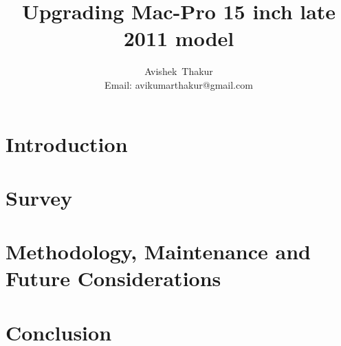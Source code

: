 \documentclass[12pt, journal, a4paper]{IEEEtran}
\begin{document}
\title{Upgrading Mac-Pro 15 inch late 2011 model}
\author{Avishek~Thakur\\%
Email: avikumarthakur@gmail.com
}

\twocolumn[
  \begin{@twocolumnfalse}
	\maketitle
	\begin{abstract}
	  \label{abstract}
	  
    \end{abstract}
    \tableofcontents
  \end{@twocolumnfalse}
  ]
\clearpage

\section{Introduction}
\label{intro}


\section{Survey}
\label{survey}



\section{Methodology, Maintenance and Future Considerations}
\label{mmf}


\section{Conclusion}
\label{conclusion}




\printbibliography
	
\end{document}
